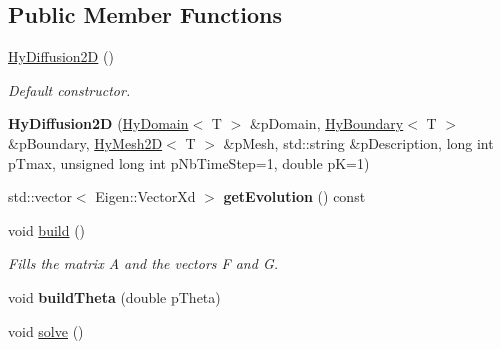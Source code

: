 \subsection*{Public Member Functions}
\begin{DoxyCompactItemize}
\item 
\hypertarget{classHyDiffusion2D_aab727755e5fd2fe558b1405b7286d80c}{
\hyperlink{classHyDiffusion2D_aab727755e5fd2fe558b1405b7286d80c}{HyDiffusion2D} ()}
\label{classHyDiffusion2D_aab727755e5fd2fe558b1405b7286d80c}

\begin{DoxyCompactList}\small\item\em Default constructor. \item\end{DoxyCompactList}\item 
\hypertarget{classHyDiffusion2D_a3e7c4a79c2a9bc64749caf72c876719c}{
{\bfseries HyDiffusion2D} (\hyperlink{classHyDomain}{HyDomain}$<$ T $>$ \&pDomain, \hyperlink{classHyBoundary}{HyBoundary}$<$ T $>$ \&pBoundary, \hyperlink{classHyMesh2D}{HyMesh2D}$<$ T $>$ \&pMesh, std::string \&pDescription, long int pTmax, unsigned long int pNbTimeStep=1, double pK=1)}
\label{classHyDiffusion2D_a3e7c4a79c2a9bc64749caf72c876719c}

\item 
\hypertarget{classHyDiffusion2D_a6bb3997b896afa965dab984f39e85adb}{
std::vector$<$ Eigen::VectorXd $>$ {\bfseries getEvolution} () const }
\label{classHyDiffusion2D_a6bb3997b896afa965dab984f39e85adb}

\item 
\hypertarget{classHyDiffusion2D_a8a6f0ed50d0e2523a6998457b4607b17}{
void \hyperlink{classHyDiffusion2D_a8a6f0ed50d0e2523a6998457b4607b17}{build} ()}
\label{classHyDiffusion2D_a8a6f0ed50d0e2523a6998457b4607b17}

\begin{DoxyCompactList}\small\item\em Fills the matrix A and the vectors F and G. \item\end{DoxyCompactList}\item 
\hypertarget{classHyDiffusion2D_a7f66b2d5a7ddafa4da4d100219ff2073}{
void {\bfseries buildTheta} (double pTheta)}
\label{classHyDiffusion2D_a7f66b2d5a7ddafa4da4d100219ff2073}

\item 
\hypertarget{classHyDiffusion2D_a8d6bbc8e9c91c4eaf7215e14d6504af6}{
void \hyperlink{classHyDiffusion2D_a8d6bbc8e9c91c4eaf7215e14d6504af6}{solve} ()}
\label{classHyDiffusion2D_a8d6bbc8e9c91c4eaf7215e14d6504af6}


\end{DoxyCompactItemize}
